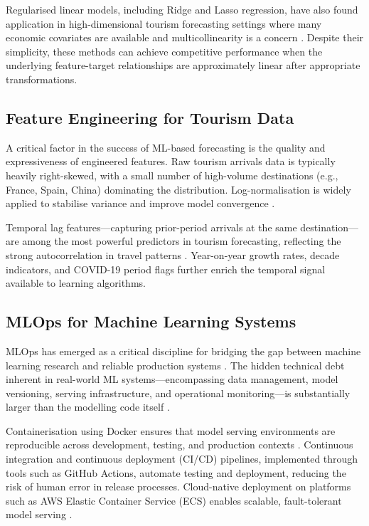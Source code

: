 \documentclass[conference]{IEEEtran}
\begin{document}
Regularised linear models, including Ridge and Lasso
regression, have also found application in high-dimensional
tourism forecasting settings where many economic
covariates are available and multicollinearity is a concern
\cite{athanasopoulos2011}. Despite their simplicity, these
methods can achieve competitive performance when the
underlying feature-target relationships are approximately
linear after appropriate transformations.

\subsection{Feature Engineering for Tourism Data}

A critical factor in the success of ML-based forecasting
is the quality and expressiveness of engineered features.
Raw tourism arrivals data is typically heavily right-skewed,
with a small number of high-volume destinations
(e.g., France, Spain, China) dominating the distribution.
Log-normalisation is widely applied to stabilise variance
and improve model convergence \cite{li2018}.

Temporal lag features---capturing prior-period arrivals at
the same destination---are among the most powerful predictors
in tourism forecasting, reflecting the strong autocorrelation
in travel patterns \cite{gunter2016}. Year-on-year growth
rates, decade indicators, and COVID-19 period flags further
enrich the temporal signal available to learning algorithms.

\subsection{MLOps for Machine Learning Systems}

MLOps has emerged as a critical discipline for bridging the
gap between machine learning research and reliable
production systems \cite{sculley2015}. The hidden technical
debt inherent in real-world ML systems---encompassing data
management, model versioning, serving infrastructure, and
operational monitoring---is substantially larger than the
modelling code itself \cite{kreuzberger2023}.

Containerisation using Docker ensures that model serving
environments are reproducible across development, testing,
and production contexts \cite{docker2021}. Continuous
integration and continuous deployment (CI/CD) pipelines,
implemented through tools such as GitHub Actions, automate
testing and deployment, reducing the risk of human error in
release processes. Cloud-native deployment on platforms such
as AWS Elastic Container Service (ECS) enables scalable,
fault-tolerant model serving \cite{aws2023}.
\end{document}
